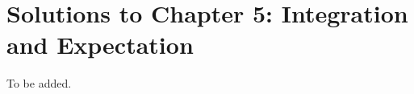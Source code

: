 \section{Solutions to Chapter 5: Integration and Expectation}
\label{sec:solutions-chapter-5}

\setcounter{Lcount}{0}
\begin{list}{5.10.}{}
\item To be added.
\end{list}

\clearpage{}


